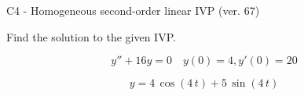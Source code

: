 \begin{exercise}
  \begin{exerciseTitle}C4 - Homogeneous second-order linear IVP (ver. 67)\end{exerciseTitle}
  \begin{exerciseStatement}
    
Find the solution to the given IVP.

    
\[y''+16y = 0 \hspace{1em} y(0) = 4 , y'(0) = 20\]

  \end{exerciseStatement}
  \begin{exerciseAnswer}
    
\[y= 4 \, \cos\left(4 \, t\right) + 5 \, \sin\left(4 \, t\right)\]

  \end{exerciseAnswer}
\end{exercise}